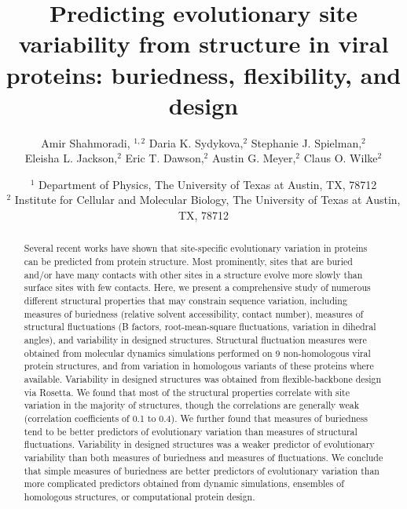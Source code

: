 \documentclass[12pt]{article}
\begin{document}
\title{Predicting evolutionary site variability from structure in viral proteins: buriedness, flexibility, and design}
\author{Amir Shahmoradi, $^{1,2}$ %
            Daria K. Sydykova,$^{2}$ Stephanie J. Spielman,$^{2}$ \\
            Eleisha L. Jackson,$^{2}$ Eric T. Dawson,$^{2}$ Austin G. Meyer,$^{2}$ Claus O. Wilke$^{2}$}

\date{\small $^1$ Department of Physics, The University of Texas at Austin, TX, 78712 \\
                 $^2$ Institute for Cellular and Molecular Biology, The University of Texas at Austin, TX, 78712 \\ }

\maketitle

\begin{abstract}
Several recent works have shown that site-specific evolutionary variation in proteins can be predicted from protein structure. Most prominently, sites that are buried and/or have many contacts with other sites in a structure evolve more slowly than surface sites with few contacts. Here, we present a comprehensive study of numerous different structural properties that may constrain sequence variation, including measures of buriedness (relative solvent accessibility, contact number), measures of structural fluctuations (B factors, root-mean-square fluctuations, variation in dihedral angles), and variability in designed structures. Structural fluctuation measures were obtained from molecular dynamics simulations performed on 9 non-homologous viral protein structures, and from variation in homologous variants of these proteins where available. Variability in designed structures was obtained from flexible-backbone design via Rosetta. We found that most of the structural properties correlate with site variation in the majority of structures, though the correlations are generally weak (correlation coefficients of 0.1 to 0.4). We further found that measures of buriedness tend to be better predictors of evolutionary variation than measures of structural fluctuations. Variability in designed structures was a weaker predictor of evolutionary variability than both measures of buriedness and measures of fluctuations. We conclude that simple measures of buriedness are better predictors of evolutionary variation than more complicated predictors obtained from dynamic simulations, ensembles of homologous structures, or computational protein design.
\end{abstract}
\end{document}
